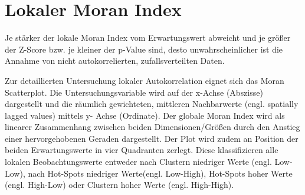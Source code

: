 \section{Lokaler Moran Index}
Je stärker der lokale Moran Index vom Erwartungswert abweicht und je größer der Z-Score bzw. je kleiner der p-Value sind, 
desto unwahrscheinlicher ist die Annahme von nicht autokorrelierten, zufallsverteilten Daten.


Zur detaillierten Untersuchung lokaler Autokorrelation eignet sich das Moran Scatterplot. 
Die Untersuchungsvariable  wird auf der x-Achse (Abszisse) dargestellt und die 
räumlich gewichteten, mittleren Nachbarwerte (engl. spatially lagged values) mittels y- Achse (Ordinate). 
Der globale Moran Index wird als linearer Zusammenhang zwischen beiden Dimensionen/Größen durch den Anstieg 
einer hervorgehobenen Geraden dargestellt. Der Plot wird zudem an Position der beiden 
Erwartungswerte in vier Quadranten zerlegt. Diese klassifizieren alle lokalen Beobachtungswerte 
entweder nach Clustern niedriger Werte (engl. Low-Low), nach Hot-Spots niedriger Werte(engl. Low-High), 
Hot-Spots hoher Werte (engl. High-Low) oder Clustern hoher Werte (engl. High-High).